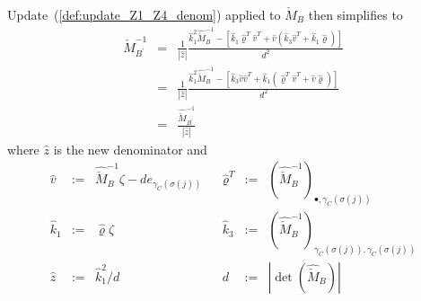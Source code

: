 \documentclass[a4paper]{article}
\begin{document}
Update~(\ref{def:update_Z1_Z4_denom})
applied to $\check{M}_{B}$ then simplifies to
\begin{eqnarray}
\label{def:update_Z4}
\check{M}_{B^{\prime}}^{-1}
&=&
\frac{1}{\left|\hat{z}\right|}
\frac{
\hat{k}_{1}^{2}\hat{\check{M}}_{B}^{-1}
-\left[
  \hat{k}_{1}\hat{\varrho}^{T}\hat{v}^{T}
  +\hat{v}\left(\hat{k}_{3}\hat{v}^{T}+\hat{k}_{1}\hat{\varrho}\right)  
 \right]
}{d^{2}}
\nonumber \\
&=&
\frac{1}{\left|\hat{z}\right|}
\frac{
\hat{k}_{1}^{2}\hat{\check{M}}_{B}^{-1}
-\left[
  \hat{k}_{3}\hat{v}\hat{v}^{T}
  +\hat{k}_{1}\left(\hat{\varrho}^{T}\hat{v}^{T}+\hat{v}\hat{\varrho}\right)  
 \right]
}{d^{2}}
\nonumber \\
&=&
\frac{\hat{\check{M}}_{B^{\prime}}^{-1}}{\left|\hat{z}\right|}
\end{eqnarray}
where $\hat{z}$ is the new denominator and
\begin{equation}
\label{def:update_Z4_entities}
\begin{array}{rclcrcl}
\hat{v}
&:=&
\hat{\check{M}}_{B}^{-1}\zeta -de_{\gamma_{C}(\sigma(j))}
&&
\hat{\varrho}^{T}
&:=&
\left(\hat{\check{M}}_{B}^{-1}\right)_{\bullet, \gamma_{C}(\sigma(j))}
\\
\hat{k}_{1}
&:=&
\hat{\varrho}\zeta
&&
\hat{k}_{3}
&:=&
\left(\hat{\check{M}}_{B}^{-1}\right)_{\gamma_{C}(\sigma(j)),
  \gamma_{C}(\sigma(j))}
\\
\hat{z}
&:=&
\hat{k}_{1}^{2}/d
&&
d
&:=&
\left|\det(\hat{\check{M}}_{B})\right|
\end{array}
\end{equation}
\end{document}
